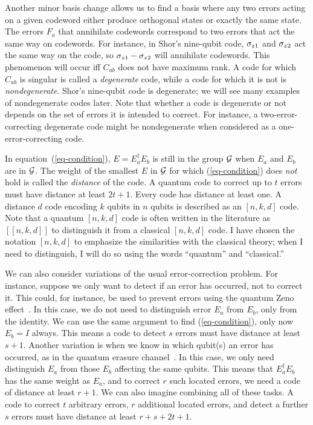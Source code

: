 Another minor basis change allows us to find a basis where any two errors
acting on a given codeword either produce orthogonal states or exactly the
same state.  The errors $F_a$  that annihilate codewords correspond to two
errors that act the same way on codewords.  For instance, in Shor's
nine-qubit code, $\sigma_{z{1}}$ and $\sigma_{z{2}}$ act the same way on the code, so $\sigma_{z{1}}
- \sigma_{z{2}}$ will annihilate codewords.  This phenomenon will occur iff $C_{ab}$
does not have maximum rank.  A code for which $C_{ab}$ is singular is
called a {\em degenerate} code, while a code for which it is not is {\em
nondegenerate}.  Shor's nine-qubit code is degenerate; we will see many
examples of nondegenerate codes later.  Note that whether a code is
degenerate or not depends on the set of errors it is intended to correct.
For instance, a two-error-correcting degenerate code might be
nondegenerate when considered as a one-error-correcting code.

In equation~(\ref{eq-condition}), $E = E_a^\dagger E_b$ is still in the group
${\cal G}$ when $E_a$ and $E_b$ are in ${\cal G}$.  The weight of the smallest $E$ in
${\cal G}$ for which (\ref{eq-condition}) does {\em not} hold is called the {\em
distance} of the code.  A quantum code to correct up to $t$ errors must
have distance at least $2t+1$.  Every code has distance at least one.  A
distance $d$ code encoding $k$ qubits in $n$ qubits is described as an
$[n, k, d]$ code.  Note that a quantum $[n,k,d]$ code is often written
in the literature as $[[n,k,d]]$ to distinguish it from a classical
$[n,k,d]$ code.  I have chosen the notation $[n,k,d]$ to emphasize the
similarities with the classical theory; when I need to distinguish, I
will do so using the words ``quantum'' and ``classical.''

We can also consider variations of the usual error-correction problem.
For instance, suppose we only want to detect if an error has occurred, not
to correct it.  This could, for instance, be used to prevent errors using the
quantum Zeno effect~\cite{vaidman}.  In this case, we do not need to
distinguish error $E_a$ from $E_b$, only from the identity.  We can use the
same argument to find (\ref{eq-condition}), only now $E_b = I$ always.
This means a code to detect $s$ errors must have distance at least $s+1$.
Another variation is when we know in which qubit(s) an error has
occurred, as in the quantum erasure channel~\cite{grassl}.  In this case, we
only need distinguish $E_a$ from those $E_b$ affecting the same qubits.
This means that $E_a^\dagger E_b$ has the same weight as $E_a$, and to correct
$r$ such located errors, we need a code of distance at least $r+1$.  We can
also imagine combining all of these tasks.  A code to correct $t$ arbitrary
errors, $r$ additional located errors, and detect a further $s$ errors must
have distance at least $r + s + 2t + 1$.

